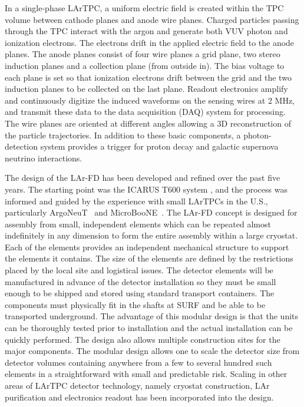 In a single-phase LArTPC, a uniform electric field is created within the TPC volume between cathode planes and anode wire planes. Charged particles passing through the TPC interact with the argon and generate both VUV photon and ionization electrons. The electrons drift in the applied electric field to the anode planes. The anode planes consist of four wire planes a grid plane, two stereo induction planes and a collection plane (from outside in). The bias voltage to each plane is set so that ionization electrons drift between the grid and the two induction planes to be collected on the last plane. Readout electronics amplify and continuously digitize the induced waveforms on the sensing wires at 2 MHz, and transmit these data to the data acquisition (DAQ)  system for processing. The wire planes are oriented at different angles allowing a 3D reconstruction of the particle trajectories. In addition to these basic components, a photon-detection system provides a trigger for proton decay and galactic supernova neutrino interactions. 


The design of the LAr-FD has been developed and refined over the past five years. The starting point was the ICARUS  T600 system \cite{Icarus-T600}, and the process was informed and guided by the experience with small  LArTPCs in the U.S., particularly ArgoNeuT~\cite{argoneut-url} and MicroBooNE~\cite{microboone-url}. The LAr-FD concept is designed for assembly from small, independent elements  which can be repeated almost indefinitely in any dimension to form the entire  assembly within a large cryostat. Each  of the elements provides an independent mechanical structure to support the elements it contains.  The size of the elements are defined by the restrictions placed by the local site and logistical issues. The detector elements will be manufactured in advance of the detector installation so they must be small enough to be shipped and stored using standard transport containers. The components must physically fit in the shafts at SURF and be able to be transported underground. The advantage of this modular design is that the units can be thoroughly  tested prior to installation and the actual installation can be quickly performed. The design also allows multiple construction sites for the major components. The modular design allows one to scale the detector size from detector volumes containing anywhere from a few to several hundred such elements in a straightforward with small  and predictable risk. Scaling in other areas of  LArTPC detector technology, namely cryostat construction, LAr purification and electronics readout has been incorporated into the design.



